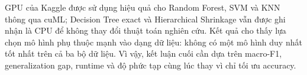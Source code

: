 GPU của Kaggle được sử dụng hiệu quả cho Random Forest, SVM và KNN thông qua cuML; Decision
Tree exact và Hierarchical Shrinkage vẫn được ghi nhận là CPU để không thay đổi thuật toán
nghiên cứu. Kết quả cho thấy lựa chọn mô hình phụ thuộc mạnh vào dạng dữ liệu: không có
một mô hình duy nhất tốt nhất trên cả ba bộ dữ liệu. Vì vậy, kết luận cuối cần dựa trên
macro-F1, generalization gap, runtime và độ phức tạp cùng lúc thay vì chỉ tối ưu accuracy.
